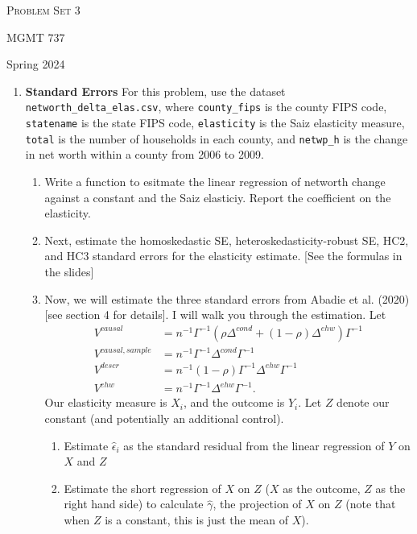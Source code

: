 \documentclass[11pt, a4paper]{article}
\begin{document}
\begin{center}
  {\Large \textsc{Problem Set 3}}

  MGMT 737
\end{center}
\begin{center}
  Spring 2024
\end{center}
\begin{enumerate}
\item \textbf{Standard Errors} For this problem, use the dataset \texttt{networth\_delta\_elas.csv}, where \texttt{county\_fips} is the county FIPS code, \texttt{statename} is the state FIPS code, \texttt{elasticity} is the Saiz elasticity measure, \texttt{total} is the number of households in each county, and \texttt{netwp\_h} is the change in net worth within a county from 2006 to 2009.
\begin{enumerate}
\item Write a function to esitmate the linear regression of networth change against a constant and the Saiz elasticiy. Report the coefficient on the elasticity. 
\item Next, estimate the homoskedastic SE, heteroskedasticity-robust SE, HC2, and HC3 standard errors for the elasticity estimate. [See the formulas in the slides]
\item Now, we will estimate the three standard errors from Abadie et al. (2020) [see section 4 for details]. I will walk you through the estimation. Let 
\begin{align*}
    V^{causal} &= n^{-1}\Gamma^{-1}(\rho\Delta^{cond} + (1-\rho)\Delta^{ehw})\Gamma^{-1}\\
    V^{causal,sample} &= n^{-1}\Gamma^{-1}\Delta^{cond}\Gamma^{-1}\\
    V^{descr} &= n^{-1}(1-\rho)\Gamma^{-1}\Delta^{ehw}\Gamma^{-1}\\
    V^{ehw} &= n^{-1}\Gamma^{-1}\Delta^{ehw}\Gamma^{-1}.
\end{align*}
Our elasticity measure is $X_{i}$, and the outcome is $Y_{i}$. Let $Z$ denote our constant (and potentially an additional control).
  \begin{enumerate}
  \item Estimate $\hat{\epsilon}_{i}$ as the standard residual from
    the linear regression of $Y$ on $X$ and $Z$
  \item Estimate the short regression of $X$ on $Z$ ($X$ as the outcome, $Z$ as the right hand side)  to calculate $\hat{\gamma}$, the projection of $X$ on $Z$ (note that when $Z$ is a constant, this is just the mean of $X$).

\end{enumerate}
\end{enumerate}
\end{enumerate}
\end{document}
